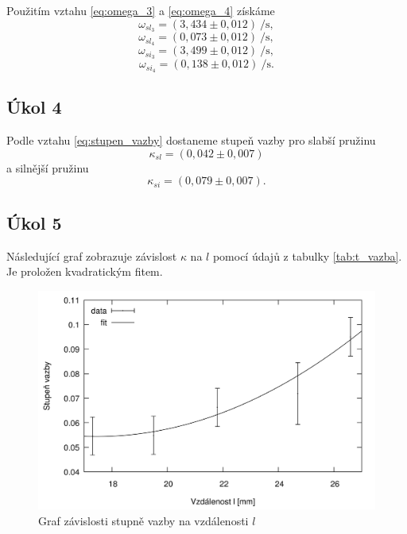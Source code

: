 \documentclass[protokol.tex]{subfiles}
\begin{document}
Použitím vztahu \eqref{eq:omega_3} a \eqref{eq:omega_4} získáme
$$ \omega_{sl_3} = (3,434 \pm 0,012) \ \si{\per\second}, $$
$$ \omega_{sl_4} = (0,073 \pm 0,012) \ \si{\per\second}, $$
$$ \omega_{si_3} = (3,499 \pm 0,012) \ \si{\per\second}, $$
$$ \omega_{si_4} = (0,138 \pm 0,012) \ \si{\per\second}. $$

\subsection*{Úkol 4}
Podle vztahu \eqref{eq:stupen_vazby} dostaneme stupeň vazby pro slabší pružinu
$$ \kappa_{sl} = (0,042 \pm 0,007) $$
a silnější pružinu
$$ \kappa_{si} = (0,079 \pm 0,007). $$

\subsection*{Úkol 5}
Následující graf zobrazuje závislost $\kappa$ na $l$ pomocí údajů z tabulky \ref{tab:t_vazba}. Je proložen kvadratickým fitem.
\begin{figure}[H]
\centering
\includegraphics[resolution=350]{plot/graf}
\caption{Graf závislosti stupně vazby na vzdálenosti $l$}
\end{figure}
\end{document}
